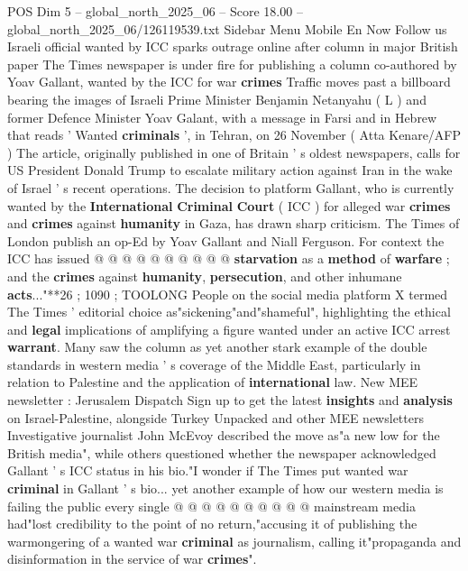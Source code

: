 \begin{textsample}{POS Dim 5 – global\_north\_2025\_06 – Score 18.00 – global\_north\_2025\_06/126119539.txt}  \label{ex:f5_pos_069}
Sidebar Menu Mobile En Now Follow us Israeli official wanted by ICC sparks outrage online after column in major British paper The Times newspaper is under fire for publishing a column co-authored by Yoav Gallant, wanted by the ICC for war \textbf{crimes} Traffic moves past a billboard bearing the images of Israeli Prime Minister Benjamin Netanyahu ( L ) and former Defence Minister Yoav Galant, with a message in Farsi and in Hebrew that reads ' Wanted \textbf{criminals} ', in Tehran, on 26 November ( Atta Kenare/AFP ) The article, originally published in one of Britain ' s oldest newspapers, calls for US President Donald Trump to escalate military action against Iran in the wake of Israel ' s recent operations.
The decision to platform Gallant, who is currently wanted by the \textbf{International} \textbf{Criminal} \textbf{Court} ( ICC ) for alleged war \textbf{crimes} and \textbf{crimes} against \textbf{humanity} in Gaza, has drawn sharp criticism.
The Times of London publish an op-Ed by Yoav Gallant and Niall Ferguson.
For context the ICC has issued @ @ @ @ @ @ @ @ @ @ \textbf{starvation} as a \textbf{method} of \textbf{warfare} ; and the \textbf{crimes} against \textbf{humanity}, \textbf{persecution}, and other inhumane \textbf{acts}..."**26 ; 1090 ; TOOLONG People on the social media platform X termed The Times ' editorial choice as"sickening"and"shameful", highlighting the ethical and \textbf{legal} implications of amplifying a figure wanted under an active ICC arrest \textbf{warrant}.
Many saw the column as yet another stark example of the double standards in western media ' s coverage of the Middle East, particularly in relation to Palestine and the application of \textbf{international} law.
New MEE newsletter : Jerusalem Dispatch Sign up to get the latest \textbf{insights} and \textbf{analysis} on Israel-Palestine, alongside Turkey Unpacked and other MEE newsletters Investigative journalist John McEvoy described the move as"a new low for the British media", while others questioned whether the newspaper acknowledged Gallant ' s ICC status in his bio."I wonder if The Times put wanted war \textbf{criminal} in Gallant ' s bio... yet another example of how our western media is failing the public every single @ @ @ @ @ @ @ @ @ @ mainstream media had"lost credibility to the point of no return,"accusing it of publishing the warmongering of a wanted war \textbf{criminal} as journalism, calling it"propaganda and disinformation in the service of war \textbf{crimes}".

\end{textsample}
